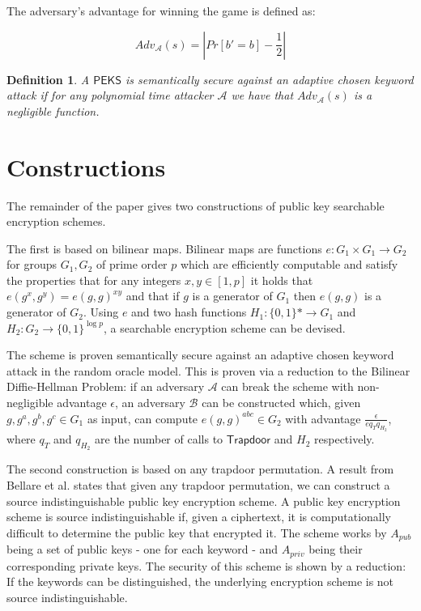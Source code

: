\documentclass[a4paper,11pt]{article}
\newtheorem{definition}{Definition}
\begin{document}
    The adversary's advantage for winning the game is defined as:

    $$Adv_{\mathcal{A}}(s) = |Pr[b' = b] - \frac{1}{2}|$$

    \begin{definition}
        A $\mathsf{PEKS}$ is semantically secure against an adaptive chosen keyword attack if for any polynomial time attacker $\mathcal{A}$ we have that $Adv_{\mathcal{A}}(s)$ is a negligible function.
    \end{definition}

    \section{Constructions}

    The remainder of the paper gives two constructions of public key searchable encryption schemes.

    The first is based on bilinear maps. Bilinear maps are functions $e:G_1 \times G_1 \to G_2$ for groups $G_1, G_2$ of prime order $p$ which are efficiently computable and satisfy the properties that for any integers $x, y \in [1,p]$ it holds that $e(g^x, g^y) = e(g, g)^{xy}$ and that if $g$ is a generator of $G_1$ then $e(g, g)$ is a generator of $G_2$. Using $e$ and two hash functions $H_1: \{0, 1\}* \to G_1$ and $H_2: G_2 \to \{0, 1\}^{\log p}$, a searchable encryption scheme can be devised.

    The scheme is proven semantically secure against an adaptive chosen keyword attack in the random oracle model. This is proven via a reduction to the Bilinear Diffie-Hellman Problem: if an adversary $\mathcal{A}$ can break the scheme with non-negligible advantage $\epsilon$, an adversary $\mathcal{B}$ can be constructed which, given $g, g^a, g^b, g^c \in G_1$ as input, can compute $e(g, g)^{abc} \in G_2$ with advantage $\frac{\epsilon}{eq_Tq_{H_2}}$, where $q_T$ and $q_{H_2}$ are the number of calls to $\mathsf{Trapdoor}$ and $H_2$ respectively.

    The second construction is based on any trapdoor permutation. A result from Bellare et al. states that given any trapdoor permutation, we can construct a source indistinguishable public key encryption scheme. A public key encryption scheme is source indistinguishable if, given a ciphertext, it is computationally difficult to determine the public key that encrypted it. The scheme works by $A_{pub}$ being a set of public keys - one for each keyword - and $A_{priv}$ being their corresponding private keys. The security of this scheme is shown by a reduction: If the keywords can be distinguished, the underlying encryption scheme is not source indistinguishable.
\end{document}
